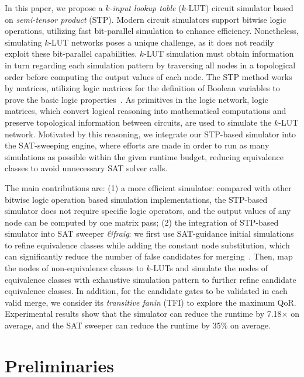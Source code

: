 \documentclass[conference]{IEEEtran}
\begin{document}
In this paper, we propose a \emph{$k$-input lookup table} ($k$-LUT) circuit simulator based on \emph{semi-tensor product} (STP).
Modern circuit simulators support bitwise logic operations, utilizing fast bit-parallel simulation to enhance efficiency. 
Nonetheless, simulating $k$-LUT networks poses a unique challenge, as it does not readily exploit these bit-parallel capabilities. 
$k$-LUT simulation must obtain information in turn regarding each simulation pattern by traversing all nodes in a topological order before computing the output values of each node.
The STP method works by matrices, utilizing logic matrices for the definition of Boolean variables to prove the basic logic properties~\cite{intro6}. 
As primitives in the logic network, logic matrices, which convert logical reasoning into mathematical computations and preserve topological information between circuits, are used to simulate the $k$-LUT network.
Motivated by this reasoning, we integrate our STP-based simulator into the SAT-sweeping engine, where efforts are made in order to run as many simulations as possible within the given runtime budget, reducing equivalence classes to avoid unnecessary SAT solver calls.

The main contributions are: (1) a more efficient simulator: compared with other bitwise logic operation based simulation implementations, the STP-based simulator does not require specific logic operators, and the output values of any node can be computed by one matrix pass; 
(2) the integration of STP-based simulator into SAT sweeper \emph{\&fraig}: we first use SAT-guidance initial simulations to refine equivalence classes while adding the constant node substitution, which can significantly reduce the number of false candidates for merging~\cite{intro7}.
Then, map the nodes of non-equivalence classes to $k$-LUTs and simulate the nodes of equivalence classes with exhaustive simulation pattern to further refine candidate equivalence classes.
In addition, for the candidate gates to be validated in each valid merge, we consider its \emph{transitive fanin} (TFI) to explore the maximum QoR.
Experimental results show that the simulator can reduce the runtime by 7.18$\times$ on average, and the SAT sweeper can reduce the runtime by 35\% on average.

\vspace{-2mm}
\section{Preliminaries}
\label{sec2}
\end{document}
